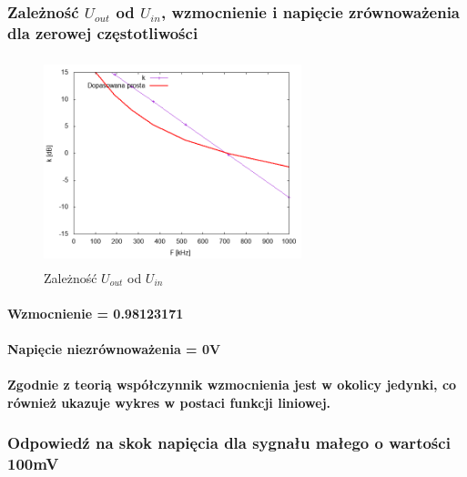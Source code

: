\documentclass[a4paper,12pt]{article}
\begin{document}
\begin{justify}
\subsubsection{Zależność $U_{out}$ od $U_{in}$, wzmocnienie i napięcie zrównoważenia dla zerowej częstotliwości}

\begin{figure}[h]
\centering
\includegraphics[width=7.5cm, height=6cm]{plot_wtornik_napieciowy}
\caption{Zależność $U_{out}$ od $U_{in}$}
\end{figure}

\paragraph{Wzmocnienie = 0.98123171}

\paragraph{Napięcie niezrównoważenia = 0V}

\paragraph{Zgodnie z teorią współczynnik wzmocnienia jest w okolicy jedynki, co również ukazuje wykres w postaci funkcji liniowej.}

\newpage

\subsubsection{Odpowiedź na skok napięcia dla sygnału małego  o wartości 100mV}


\end{justify}
\end{document}

